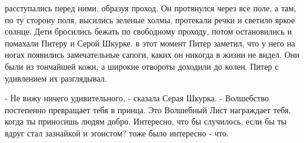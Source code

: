 расступались перед ними, образуя проход. Он протянулся через все поле, 
а там, по ту сторону поля, высились зеленые холмы, протекали речки и 
светило яркое солнце. Дети бросились бежать по свободному проходу, 
потом остановились и помахали Питеру и Серой Шкурке.
 в этот момент Питер заметил, что у него на ногах появились 
замечательные сапоги, каких он никогда в жизни не видел. Они были из 
тончайшей кожи, а широкие отвороты доходили до колен. Питер с 
удивлением их разглядывал.
\par- Не вижу ничего удивительного, - сказала Серая Шкурка. - 
Волшебство постепенно превращает тебя в принца. Это Волшебный Лист 
награждает тебя, когда ты приносишь людям добро. Интересно, что бы 
случилось, если бы ты вдруг стал зазнайкой и эгоистом?
 тоже было интересно - что.